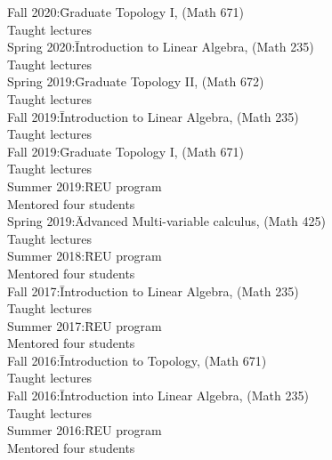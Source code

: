 \documentclass[11pt]{amsart}
\theoremstyle{plain}
\theoremstyle{definition}
\theoremstyle{remark}
\begin{document}
\begin{tabbing}
  
Fall 2020:\quad\quad\quad\= Graduate Topology I, (Math 671)\\
\>Taught lectures \\
  
  
Spring 2020:\quad\quad\= Introduction to Linear Algebra, (Math 235)\\
\>Taught lectures \\


  
Spring 2019:\quad\quad\= Graduate Topology II, (Math 672)\\
\>Taught lectures \\

  
Fall 2019:\quad\quad\quad\= Introduction to Linear Algebra, (Math 235)\\
\>Taught lectures \\

  
Fall 2019:\quad\quad\quad\= Graduate Topology I, (Math 671)\\
\>Taught lectures \\


Summer 2019:\quad\= REU program\\
\>Mentored four students \\
  
  
Spring 2019:\quad\quad\= Advanced Multi-variable calculus, (Math 425)\\
\>Taught lectures \\


Summer 2018:\quad\= REU program\\
\>Mentored four students \\

  
Fall 2017:\quad\quad\quad\= Introduction to Linear Algebra, (Math 235)\\
\>Taught lectures \\


Summer 2017:\quad\= REU program\\
\>Mentored four students \\



  
Fall 2016:\quad\quad\quad\= Introduction to Topology, (Math 671)\\
\>Taught lectures \\


Fall 2016:\quad\quad\quad\= Introduction into Linear Algebra, (Math 235)\\
\>Taught lectures \\

Summer 2016:\quad\= REU program\\
\>Mentored four students \\


\end{tabbing}
\end{document}
